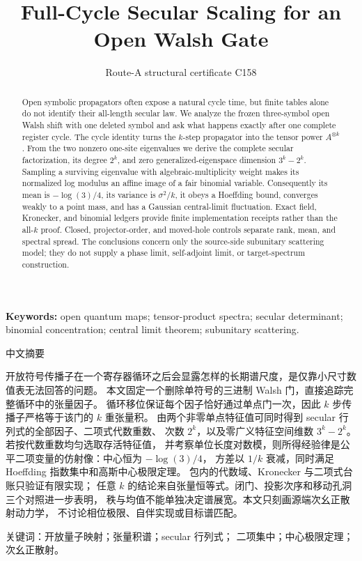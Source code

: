 \documentclass[10pt]{article}
\title{\vspace{-1.8em}Full-Cycle Secular Scaling for an Open Walsh Gate}
\author{Route-A structural certificate C158}
\date{}
\begin{document}
\maketitle
\begin{abstract}
Open symbolic propagators often expose a natural cycle time, but finite tables
alone do not identify their all-length secular law.  We analyze the frozen
three-symbol open Walsh shift with one deleted symbol and ask what happens
exactly after one complete register cycle.  The cycle identity turns the
$k$-step propagator into the tensor power $A^{\otimes k}$.  From the two
nonzero one-site eigenvalues we derive the complete secular factorization, its
degree $2^k$, and zero generalized-eigenspace dimension $3^k-2^k$.  Sampling a
surviving eigenvalue with algebraic-multiplicity weight makes its normalized
log modulus an affine image of a fair binomial variable.  Consequently its
mean is $-\log(3)/4$, its variance is $\sigma^2/k$, it obeys a Hoeffding bound,
converges weakly to a point mass, and has a Gaussian central-limit fluctuation.
Exact field, Kronecker, and binomial ledgers provide finite implementation
receipts rather than the all-$k$ proof.  Closed, projector-order, and
moved-hole controls separate rank, mean, and spectral spread.  The conclusions
concern only the source-side subunitary scattering model; they do not supply a
phase limit, self-adjoint limit, or target-spectrum construction.
\end{abstract}
\noindent\textbf{Keywords:} open quantum maps; tensor-product spectra;
secular determinant; binomial concentration; central limit theorem;
subunitary scattering.

\begin{otherlanguage}{chinese-simplified}
\begin{center}{\large 中文摘要}\end{center}
\begin{sloppypar}
开放符号传播子在一个寄存器循环之后会显露怎样的长期谱尺度，是仅靠小尺寸数值表无法回答的问题。
本文固定一个删除单符号的三进制 \foreignlanguage{english}{Walsh} 门，直接追踪完整循环中的张量因子。
循环移位保证每个因子恰好通过单点门一次，因此 $k$ 步传播子严格等于该门的 $k$ 重张量积。
由两个非零单点特征值可同时得到 \foreignlanguage{english}{secular} 行列式的全部因子、二项式代数重数、
次数 $2^k$，以及零广义特征空间维数 $3^k-2^k$。若按代数重数均匀选取存活特征值，
并考察单位长度对数模，则所得经验律是公平二项变量的仿射像：中心恒为 $-\log(3)/4$，
方差以 $1/k$ 衰减，同时满足 \foreignlanguage{english}{Hoeffding} 指数集中和高斯中心极限定理。
包内的代数域、\foreignlanguage{english}{Kronecker} 与二项式台账只验证有限实现；
任意 $k$ 的结论来自张量恒等式。闭门、投影次序和移动孔洞三个对照进一步表明，
秩与均值不能单独决定谱展宽。本文只刻画源端次幺正散射动力学，
不讨论相位极限、自伴实现或目标谱匹配。
\end{sloppypar}
\noindent 关键词：开放量子映射；张量积谱；\foreignlanguage{english}{secular} 行列式；
二项集中；中心极限定理；次幺正散射。
\end{otherlanguage}
\end{document}
